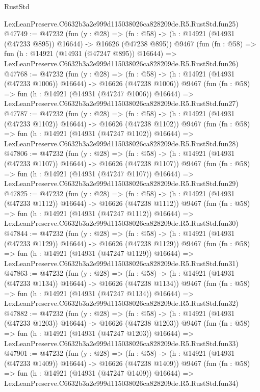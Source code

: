 \begin{lexlean}{RustStd}
\begin{coremodule}
    LexLeanPreserve.C6632b3a2e999d115038026ca828209de.R5.RustStd.fun25)
@47749 := @47232
    (fun (y : @28) =>
    (fn : @58) -> (h : @14921 (@14931 (@47233 @895)) @16644) -> @16626 (@47238 @895))
    @9467
    (fun (fn : @58) =>
    fun (h : @14921 (@14931 (@47247 @895)) @16644) =>
    LexLeanPreserve.C6632b3a2e999d115038026ca828209de.R5.RustStd.fun26)
@47768 := @47232
    (fun (y : @28) =>
    (fn : @58) -> (h : @14921 (@14931 (@47233 @1006)) @16644) -> @16626 (@47238 @1006))
    @9467
    (fun (fn : @58) =>
    fun (h : @14921 (@14931 (@47247 @1006)) @16644) =>
    LexLeanPreserve.C6632b3a2e999d115038026ca828209de.R5.RustStd.fun27)
@47787 := @47232
    (fun (y : @28) =>
    (fn : @58) -> (h : @14921 (@14931 (@47233 @1102)) @16644) -> @16626 (@47238 @1102))
    @9467
    (fun (fn : @58) =>
    fun (h : @14921 (@14931 (@47247 @1102)) @16644) =>
    LexLeanPreserve.C6632b3a2e999d115038026ca828209de.R5.RustStd.fun28)
@47806 := @47232
    (fun (y : @28) =>
    (fn : @58) -> (h : @14921 (@14931 (@47233 @1107)) @16644) -> @16626 (@47238 @1107))
    @9467
    (fun (fn : @58) =>
    fun (h : @14921 (@14931 (@47247 @1107)) @16644) =>
    LexLeanPreserve.C6632b3a2e999d115038026ca828209de.R5.RustStd.fun29)
@47825 := @47232
    (fun (y : @28) =>
    (fn : @58) -> (h : @14921 (@14931 (@47233 @1112)) @16644) -> @16626 (@47238 @1112))
    @9467
    (fun (fn : @58) =>
    fun (h : @14921 (@14931 (@47247 @1112)) @16644) =>
    LexLeanPreserve.C6632b3a2e999d115038026ca828209de.R5.RustStd.fun30)
@47844 := @47232
    (fun (y : @28) =>
    (fn : @58) -> (h : @14921 (@14931 (@47233 @1129)) @16644) -> @16626 (@47238 @1129))
    @9467
    (fun (fn : @58) =>
    fun (h : @14921 (@14931 (@47247 @1129)) @16644) =>
    LexLeanPreserve.C6632b3a2e999d115038026ca828209de.R5.RustStd.fun31)
@47863 := @47232
    (fun (y : @28) =>
    (fn : @58) -> (h : @14921 (@14931 (@47233 @1134)) @16644) -> @16626 (@47238 @1134))
    @9467
    (fun (fn : @58) =>
    fun (h : @14921 (@14931 (@47247 @1134)) @16644) =>
    LexLeanPreserve.C6632b3a2e999d115038026ca828209de.R5.RustStd.fun32)
@47882 := @47232
    (fun (y : @28) =>
    (fn : @58) -> (h : @14921 (@14931 (@47233 @1203)) @16644) -> @16626 (@47238 @1203))
    @9467
    (fun (fn : @58) =>
    fun (h : @14921 (@14931 (@47247 @1203)) @16644) =>
    LexLeanPreserve.C6632b3a2e999d115038026ca828209de.R5.RustStd.fun33)
@47901 := @47232
    (fun (y : @28) =>
    (fn : @58) -> (h : @14921 (@14931 (@47233 @1409)) @16644) -> @16626 (@47238 @1409))
    @9467
    (fun (fn : @58) =>
    fun (h : @14921 (@14931 (@47247 @1409)) @16644) =>
    LexLeanPreserve.C6632b3a2e999d115038026ca828209de.R5.RustStd.fun34)

\end{coremodule}
\end{lexlean}

